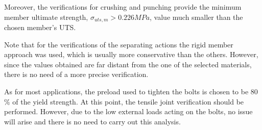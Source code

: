 Moreover, the verifications for crushing and punching provide the minimum member ultimate strength, $\sigma_{uts,m} > 0.226 MPa$, value much smaller than the chosen member's UTS.

Note that for the verifications of the separating actions the rigid member approach was used, which is usually more conservative than the others. However, since the values obtained are far distant from the one of the selected materials, there is no need of a more precise verification.

As for most applications, the preload used to tighten the bolts is chosen to be 80$\%$ of the yield strength. At this point, the tensile joint verification should be performed. However, due to the low external loads acting on the bolts, no issue will arise and there is no need to carry out this analysis. 